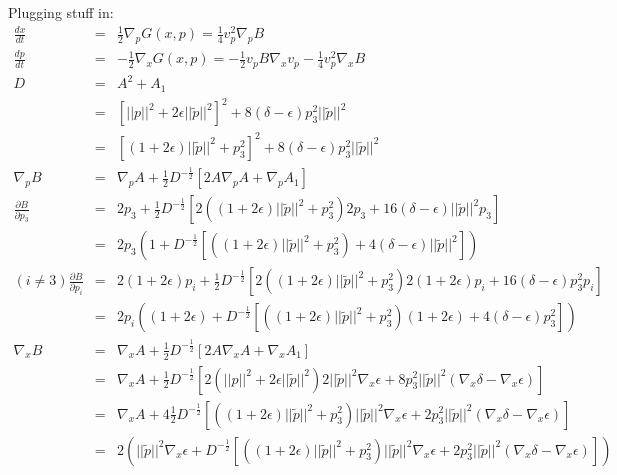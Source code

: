 \documentclass[12pt]{article}
\begin{document}
Plugging stuff in:
\begin{eqnarray}
\frac{dx}{dt}   &=&  \frac{1}{2}\nabla_p G(x,p) =  \frac{1}{4}v_p^2\nabla_pB\\
\frac{dp}{dt}   &=& -\frac{1}{2}\nabla_x G(x,p) = -\frac{1}{2}v_pB\nabla_xv_p-\frac{1}{4}v_p^2\nabla_xB\\
D               &=&  A^2 + A_1\\
                &=&  \left[||p||^2+2\epsilon||\tilde{p}||^2\right]^2+8(\delta-\epsilon)p_3^2||\tilde{p}||^2\\
                &=&  \left[(1+2\epsilon)||\tilde{p}||^2+p_3^2\right]^2+8(\delta-\epsilon)p_3^2||\tilde{p}||^2\\
\nabla_p B      &=&  \nabla_p A+\frac{1}{2}D^{-\frac{1}{2}}\left[2A\nabla_p A + \nabla_p A_1\right]\\
\frac{\partial B}{\partial p_3} &=& 2p_3+\frac{1}{2}D^{-\frac{1}{2}}\left[2((1+2\epsilon)||\tilde{p}||^2+p_3^2)2p_3+16(\delta-\epsilon)||\tilde{p}||^2p_3\right]\\
                &=& 2p_3\left(1+D^{-\frac{1}{2}}\left[((1+2\epsilon)||\tilde{p}||^2+p_3^2)+4(\delta-\epsilon)||\tilde{p}||^2\right]\right)\\
(i\neq3)\frac{\partial B}{\partial p_i} &=&  2(1+2\epsilon)p_i+\frac{1}{2}D^{-\frac{1}{2}}\left[2((1+2\epsilon)||\tilde{p}||^2+p_3^2)2(1+2\epsilon)p_i + 16(\delta-\epsilon)p_3^2p_i\right]\\
                &=&  2p_i\left((1+2\epsilon)+D^{-\frac{1}{2}}\left[((1+2\epsilon)||\tilde{p}||^2+p_3^2)(1+2\epsilon) + 4(\delta-\epsilon)p_3^2\right]\right)\\
\nabla_x B      &=&  \nabla_x A+\frac{1}{2}D^{-\frac{1}{2}}\left[2A\nabla_x A + \nabla_x A_1\right]\\
                &=&  \nabla_x A+\frac{1}{2}D^{-\frac{1}{2}}\left[2(||p||^2+2\epsilon||\tilde{p}||^2)2||\tilde{p}||^2\nabla_x \epsilon + 8p_3^2||\tilde{p}||^2(\nabla_x \delta - \nabla_x \epsilon) \right] \nonumber\\
                &=&  \nabla_x A+4\frac{1}{2}D^{-\frac{1}{2}}\left[((1+2\epsilon)||\tilde{p}||^2+p_3^2)||\tilde{p}||^2\nabla_x \epsilon + 2p_3^2||\tilde{p}||^2(\nabla_x \delta - \nabla_x \epsilon) \right] \nonumber\\
                &=&  2\left(||\tilde{p}||^2\nabla_x \epsilon+D^{-\frac{1}{2}}\left[((1+2\epsilon)||\tilde{p}||^2+p_3^2)||\tilde{p}||^2\nabla_x \epsilon + 2p_3^2||\tilde{p}||^2(\nabla_x \delta - \nabla_x \epsilon) \right] \right) \nonumber
\end{eqnarray}
\end{document}
